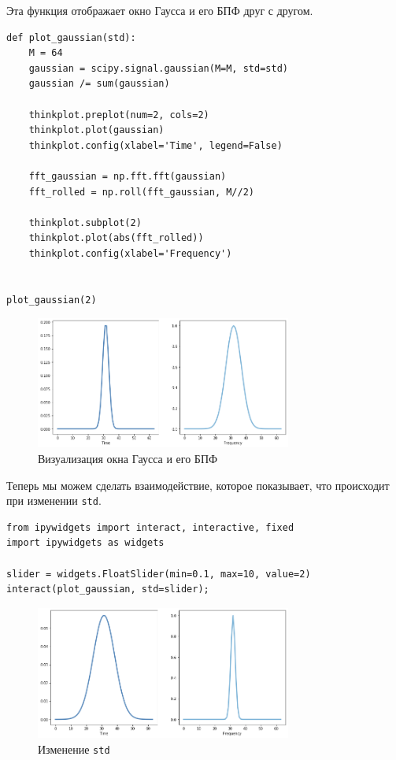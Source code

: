 \documentclass[a4paper,12pt]{report}
\begin{document}
Эта функция отображает окно Гаусса и его БПФ друг с другом.

\begin{lstlisting}[caption=Функция \texttt{plot\_gaussian}]
def plot_gaussian(std):
    M = 64
    gaussian = scipy.signal.gaussian(M=M, std=std)
    gaussian /= sum(gaussian)
    
    thinkplot.preplot(num=2, cols=2)
    thinkplot.plot(gaussian)
    thinkplot.config(xlabel='Time', legend=False)

    fft_gaussian = np.fft.fft(gaussian)
    fft_rolled = np.roll(fft_gaussian, M//2)
    
    thinkplot.subplot(2)
    thinkplot.plot(abs(fft_rolled))
    thinkplot.config(xlabel='Frequency')

    
plot_gaussian(2)
\end{lstlisting}

\begin{figure}[H]
        \centering
        \includegraphics[width=0.75\textwidth]{lab8_fig2_4.png}
        \caption{Визуализация окна Гаусса и его БПФ}
        \label{fig:lab8_fig2_4}
\end{figure}

Теперь мы можем сделать взаимодействие, которое показывает, что происходит при изменении \texttt{std}.

\begin{lstlisting}[caption=Изменение \texttt{std}]
from ipywidgets import interact, interactive, fixed
import ipywidgets as widgets

slider = widgets.FloatSlider(min=0.1, max=10, value=2)
interact(plot_gaussian, std=slider);
\end{lstlisting}

\begin{figure}[H]
        \centering
        \includegraphics[width=0.75\textwidth]{lab8_fig2_5.png}
        \caption{Изменение \texttt{std}}
        \label{fig:lab8_fig2_5}
\end{figure}
\end{document}
